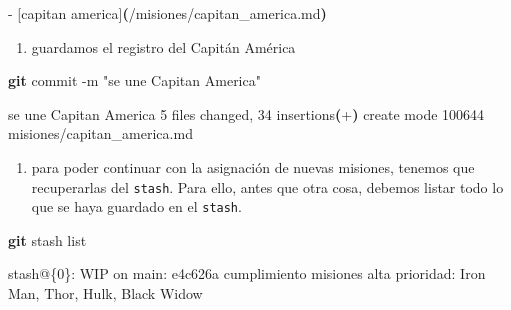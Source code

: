\documentclass[
]{book}
\newenvironment{Shaded}{\begin{snugshade}}{\end{snugshade}}
\newcommand{\AttributeTok}[1]{\textcolor[rgb]{0.13,0.29,0.53}{#1}}
\newcommand{\ErrorTok}[1]{\textcolor[rgb]{0.64,0.00,0.00}{\textbf{#1}}}
\newcommand{\ExtensionTok}[1]{#1}
\newcommand{\FunctionTok}[1]{\textcolor[rgb]{0.13,0.29,0.53}{\textbf{#1}}}
\newcommand{\KeywordTok}[1]{\textcolor[rgb]{0.13,0.29,0.53}{\textbf{#1}}}
\newcommand{\NormalTok}[1]{#1}
\newcommand{\StringTok}[1]{\textcolor[rgb]{0.31,0.60,0.02}{#1}}
\providecommand{\tightlist}{%
  \setlength{\itemsep}{0pt}\setlength{\parskip}{0pt}}
\begin{document}
\begin{Shaded}
\begin{Highlighting}[]
\ExtensionTok{{-}}\NormalTok{ [capitan america]}\ErrorTok{(}\ExtensionTok{/misiones/capitan\_america.md}\KeywordTok{)}
\end{Highlighting}
\end{Shaded}

\begin{enumerate}
\def\labelenumi{\arabic{enumi}.}
\setcounter{enumi}{2}
\tightlist
\item
  guardamos el registro del Capitán América
\end{enumerate}

\begin{Shaded}
\begin{Highlighting}[]
\FunctionTok{git}\NormalTok{ commit }\AttributeTok{{-}m} \StringTok{"se une Capitan America"}
\end{Highlighting}
\end{Shaded}

\begin{Shaded}
\begin{Highlighting}[]
\ExtensionTok{[main}\NormalTok{ 5319e68] se une Capitan America}
 \ExtensionTok{5}\NormalTok{ files changed, 34 insertions}\ErrorTok{(}\ExtensionTok{+}\KeywordTok{)}
 \ExtensionTok{create}\NormalTok{ mode 100644 misiones/capitan\_america.md}
\end{Highlighting}
\end{Shaded}

\begin{enumerate}
\def\labelenumi{\arabic{enumi}.}
\setcounter{enumi}{3}
\tightlist
\item
  para poder continuar con la asignación de nuevas misiones, tenemos que recuperarlas del \texttt{stash}. Para ello, antes que otra cosa, debemos listar todo lo que se haya guardado en el \texttt{stash}.
\end{enumerate}

\begin{Shaded}
\begin{Highlighting}[]
\FunctionTok{git}\NormalTok{ stash list}
\end{Highlighting}
\end{Shaded}

\begin{Shaded}
\begin{Highlighting}[]
\ExtensionTok{stash@\{0\}:}\NormalTok{ WIP on main: e4c626a cumplimiento misiones alta prioridad: Iron Man, Thor, Hulk, Black Widow}
\end{Highlighting}
\end{Shaded}
\end{document}
